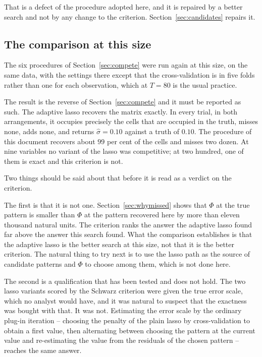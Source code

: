 That is a defect of the procedure adopted here, and it is repaired by a better search
and not by any change to the criterion. Section~\ref{sec:candidates} repairs it.

\subsection{The comparison at this size}
\label{sec:largecompare}

The six procedures of Section~\ref{sec:compete} were run again at this size, on the
same data, with the settings there except that the cross-validation is in five folds
rather than one for each observation, which at $T = 80$ is the usual practice.



The result is the reverse of Section~\ref{sec:compete} and it must be reported as
such. The adaptive lasso recovers the matrix exactly. In every trial, in both
arrangements, it occupies precisely the cells that are occupied in the truth, misses
none, adds none, and returns $\hat\sigma = 0.10$ against a truth of $0.10$. The
procedure of this document recovers about $99$ per cent of the cells and misses two
dozen. At nine variables no variant of the lasso was competitive; at two hundred, one
of them is exact and this criterion is not.

Two things should be said about that before it is read as a verdict on the criterion.

The first is that it is not one. Section~\ref{sec:whymissed} shows that
$\Phi$ at the true pattern is smaller than $\Phi$ at the pattern recovered here by
more than eleven thousand natural units. The criterion ranks the answer the adaptive
lasso found far above the answer this search found. What the comparison establishes
is that the adaptive lasso is the better search at this size, not that it is the
better criterion. The natural thing to try next is to use the lasso path as the
source of candidate patterns and $\Phi$ to choose among them, which is not done here.

The second is a qualification that has been tested and does not hold. The two lasso
variants scored by the Schwarz criterion were given the true error scale, which no
analyst would have, and it was natural to suspect that the exactness was bought with
that. It was not. Estimating the error scale by the ordinary plug-in iteration --
choosing the penalty of the plain lasso by cross-validation to obtain a first value,
then alternating between choosing the pattern at the current value and re-estimating
the value from the residuals of the chosen pattern -- reaches the same answer.

